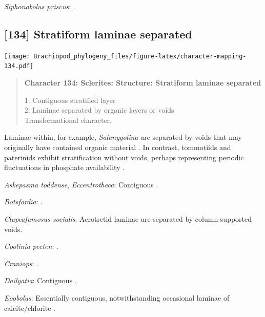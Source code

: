 \documentclass[openany]{book}
\begin{document}
\hypertarget{Siphonobolus_priscus-coding-133}{}
\emph{Siphonobolus priscus}: \citep{Williams2004Chemicostructure}.

\subsection*{{[}134{]} Stratiform laminae
separated}\label{stratiform-laminae-separated}

\texttt{[image: Brachiopod\_phylogeny\_files/figure-latex/character-mapping-134.pdf]}

\begin{quote}
\textbf{Character 134: Sclerites: Structure: Stratiform laminae
separated}

1: Contiguous stratified layer\\
2: Laminae separated by organic layers or voids\\
Transformational character.
\end{quote}

Laminae within, for example, \emph{Salanygolina} are separated by voids
that may originally have contained organic material
\citep[e.g.][]{Holmer2009Theenigmatic}. In contrast, tommotiids and
paterinids exhibit stratification without voids, perhaps representing
periodic fluctuations in phosphate availability
\citep{Balthasar2009Homologousskeletal}.

\hypertarget{Askepasma_toddense-coding-134}{}
\emph{Askepasma toddense}, \emph{Eccentrotheca}: Contiguous
\citep{Balthasar2009Homologousskeletal}.

\hypertarget{Botsfordia-coding-134}{}
\emph{Botsfordia}: \citet{Skovsted2003EarlyCambrian}.

\hypertarget{Clupeafumosus_socialis-coding-134}{}
\emph{Clupeafumosus socialis}: Acrotretid laminae are separated by
column-supported voids.

\hypertarget{Coolinia_pecten-coding-134}{}
\emph{Coolinia pecten}: \citet{Dewing2004}.

\hypertarget{Craniops-coding-134}{}
\emph{Craniops}: \citep[fig. 249.1]{Williams1997Introduction}.

\hypertarget{Dailyatia-coding-134}{}
\emph{Dailyatia}: Contiguous \citep[figs. 54--55]{Skovsted2015Theearly}.

\hypertarget{Eoobolus-coding-134}{}
\emph{Eoobolus}: Essentially contiguous, notwithstanding occasional
laminae of calcite/chlorite \citep{Balthasar2007Anearly}.
\end{document}
